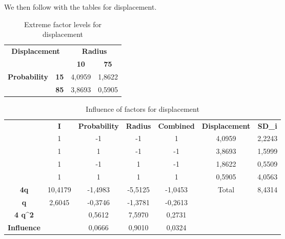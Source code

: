 We then follow with the tables for displacement.

\begin{table}[H]
\centering
\begin{tabular}{|cc|cc|}
\hline
\multicolumn{2}{|c|}{\multirow{2}{*}{\textbf{Displacement}}} & \multicolumn{2}{c|}{\textbf{Radius}} \\ \cline{3-4} 
\multicolumn{2}{|c|}{} & \multicolumn{1}{c|}{\textbf{10}} & \textbf{75} \\ \hline
\multicolumn{1}{|c|}{\multirow{2}{*}{\textbf{Probability}}} & \textbf{15} & \multicolumn{1}{c|}{4,0959} & 1,8622 \\ \cline{2-4} 
\multicolumn{1}{|c|}{} & \textbf{85} & \multicolumn{1}{c|}{3,8693} & 0,5905 \\ \hline
\end{tabular}
\caption{Extreme factor levels for displacement}
\end{table}

\begin{table}[H]\label{tab:InflDisp}
\centering
\begin{tabular}{c|c|c|c|c|cc}
\cline{2-7}
 & \textbf{I} & \textbf{Probability} & \textbf{Radius} & \textbf{Combined} & \multicolumn{1}{c|}{\textbf{Displacement}} & \multicolumn{1}{c|}{\textbf{SD\_i}} \\ \cline{2-7} 
 & 1 & -1 & -1 & 1 & \multicolumn{1}{c|}{4,0959} & \multicolumn{1}{c|}{2,2243} \\ \cline{2-7} 
 & 1 & 1 & -1 & -1 & \multicolumn{1}{c|}{3,8693} & \multicolumn{1}{c|}{1,5999} \\ \cline{2-7} 
 & 1 & -1 & 1 & -1 & \multicolumn{1}{c|}{1,8622} & \multicolumn{1}{c|}{0,5509} \\ \cline{2-7} 
 & 1 & 1 & 1 & 1 & \multicolumn{1}{c|}{0,5905} & \multicolumn{1}{c|}{4,0563} \\ \hline
\multicolumn{1}{|c|}{\textbf{4q}} & 10,4179 & -1,4983 & -5,5125 & -1,0453 & \multicolumn{1}{c|}{Total} & \multicolumn{1}{c|}{8,4314} \\ \hline
\multicolumn{1}{|c|}{\textbf{q}} & 2,6045 & -0,3746 & -1,3781 & -0,2613 &  &  \\ \cline{1-5}
\multicolumn{1}{|c|}{\textbf{4 q\textasciicircum{}2}} &  & 0,5612 & 7,5970 & 0,2731 &  &  \\ \cline{1-5}
\multicolumn{1}{|c|}{\textbf{Influence}} &  & 0,0666 & 0,9010 & 0,0324 &  &  \\ \cline{1-5}
\end{tabular}
\caption{Influence of factors for displacement}
\end{table}

